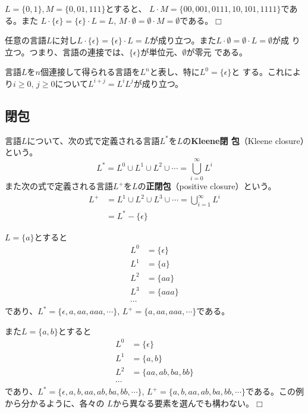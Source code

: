 \begin{example}
 $L = \{0, 1\}, M = \{0, 01, 111\}$とすると、
 $L\cdot M = \{00, 001, 0111, 10, 101, 1111\}$である。また
 $L \cdot \{\epsilon\} = \{\epsilon\}\cdot L = L$, 
 $M\cdot \emptyset = \emptyset \cdot M = \emptyset$である。$\Box$
\end{example}

任意の言語$L$に対し$L\cdot \{\epsilon\} = \{\epsilon\}\cdot L
= L$が成り立つ。また$L\cdot \emptyset = \emptyset\cdot L = \emptyset$が成
り立つ。つまり、言語の連接では、$\{\epsilon\}$が単位元、$\emptyset$が零元
である。

言語$L$を$n$個連接して得られる言語を$L^n$と表し、特に$L^0=\{\epsilon\}$と
する。これにより$i\geq 0,\, j\geq 0$について$L^{i+j} = L^i L^j$が成り立つ。

\subsection{閉包}

言語$L$について、次の式で定義される言語$L^\ast$を$L$の{\bfseries Kleene閉
包}（Kleene closure）という。
\[
 L^\ast = L^0 \cup L^1 \cup L^2 \cup \cdots = \bigcup_{i=0}^{\infty} L^i
\]
また次の式で定義される言語$L^+$を$L$の{\bfseries 正閉包}（positive
closure）という。
\begin{align*}
 L^+ & = L^1 \cup L^2 \cup L^3 \cup \cdots = \bigcup_{i=1}^{\infty} L^i \\
     & = L^\ast - \{\epsilon\}
\end{align*}

\begin{example}
 $L=\{a\}$とすると
 \begin{align*}
  L^0 & = \{\epsilon\} \\
  L^1 & = \{a\} \\
  L^2 & = \{aa\} \\
  L^3 & = \{aaa\} \\
  \cdots
 \end{align*}
 であり、$L^\ast = \{\epsilon, a, aa, aaa, \cdots\}$,
 $L^+ = \{a, aa, aaa, \cdots\}$である。

 また$L = \{a, b\}$とすると
 \begin{align*}
  L^0 & = \{\epsilon\} \\
  L^1 & = \{a, b\} \\
  L^2 & = \{aa, ab, ba, bb\} \\
  \cdots & 
 \end{align*}
 であり、$L^\ast = \{\epsilon, a, b, aa, ab, ba, bb, \cdots\}$, $L^+ =
 \{a, b, aa, ab, ba, bb, \cdots\}$である。この例から分かるように、各々の
 $L$から異なる要素を選んでも構わない。$\Box$
\end{example}

